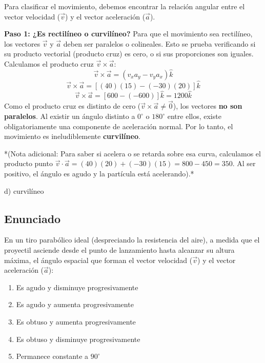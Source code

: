\documentclass[12pt, a4paper]{article}
\begin{document}
Para clasificar el movimiento, debemos encontrar la relación angular entre el vector velocidad ($\vec{v}$) y el vector aceleración ($\vec{a}$). 

\textbf{Paso 1: ¿Es rectilíneo o curvilíneo?}
Para que el movimiento sea rectilíneo, los vectores $\vec{v}$ y $\vec{a}$ deben ser paralelos o colineales. Esto se prueba verificando si su producto vectorial (producto cruz) es cero, o si sus proporciones son iguales.
Calculamos el producto cruz $\vec{v} \times \vec{a}$:
$$ \vec{v} \times \vec{a} = (v_x a_y - v_y a_x) \hat{k} $$
$$ \vec{v} \times \vec{a} = [(40)(15) - (-30)(20)] \hat{k} $$
$$ \vec{v} \times \vec{a} = [600 - (-600)] \hat{k} = 1200 \hat{k} $$
Como el producto cruz es distinto de cero ($\vec{v} \times \vec{a} \neq \vec{0}$), los vectores \textbf{no son paralelos}. Al existir un ángulo distinto a $0^\circ$ o $180^\circ$ entre ellos, existe obligatoriamente una componente de aceleración normal. Por lo tanto, el movimiento es ineludiblemente \textbf{curvilíneo}.

*(Nota adicional: Para saber si acelera o se retarda sobre esa curva, calculamos el producto punto $\vec{v} \cdot \vec{a} = (40)(20) + (-30)(15) = 800 - 450 = 350$. Al ser positivo, el ángulo es agudo y la partícula está acelerando).*

\begin{tcolorbox}[colback=green!5!white, colframe=green!50!black, title=Respuesta Final]
\centering \Large d) curvilíneo
\end{tcolorbox}

\newpage

\subsection*{Enunciado}
En un tiro parabólico ideal (despreciando la resistencia del aire), a medida que el proyectil asciende desde el punto de lanzamiento hasta alcanzar su altura máxima, el ángulo espacial que forman el vector velocidad ($\vec{v}$) y el vector aceleración ($\vec{a}$):
\begin{enumerate}[label=\alph*)]
    \item Es agudo y disminuye progresivamente
    \item Es agudo y aumenta progresivamente
    \item Es obtuso y aumenta progresivamente
    \item Es obtuso y disminuye progresivamente
    \item Permanece constante a $90^\circ$
\end{enumerate}
\end{document}
